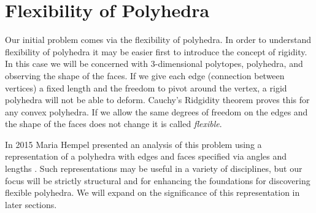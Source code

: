 \section{Flexibility of Polyhedra}

Our initial problem comes via the flexibility of polyhedra. In order to
understand flexibility of polyhedra it may be easier first to introduce the
concept of rigidity. In this case we will be concerned with 3-dimensional
polytopes, polyhedra, and observing the shape of the faces. If we give each
edge (connection between vertices) a fixed length and the freedom to pivot
around the vertex, a rigid polyhedra will not be able to deform. Cauchy's
Ridgidity theorem proves this for any convex polyhedra\cite{Gluck_1975}.
If we allow the same degrees of freedom on the edges and the shape of the
faces does not change it is called \emph{flexible}\cite{Connelly_1977}.

In 2015 Maria Hempel presented an analysis of this problem using a representation
of a polyhedra with edges and faces specified via angles and lengths
\cite{Hempel_2015}.
Such representations may be useful in a variety of disciplines, but our
focus will be strictly structural and for enhancing the foundations for
discovering flexible polyhedra.
We will expand on the significance of this representation in later sections.

